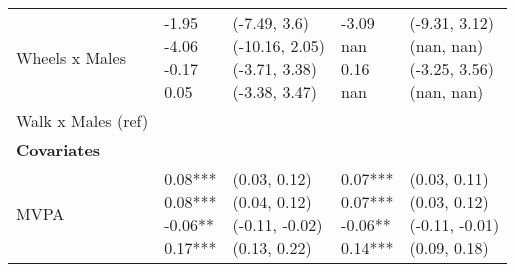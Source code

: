 \documentclass[10pt]{article}
\begin{document}
\begin{table}
\begin{center}
\begin{small}
\begin{tabular}{lllll}
\quad Wheels x Males    &  \makecell[l]{\textnormal{-1.95\phantom{***}} \\\textnormal{-4.06\phantom{***}} \\\textnormal{-0.17\phantom{***}} \\\textnormal{0.05\phantom{***}} \\}   &  \makecell[l]{\textnormal{(-7.49, 3.6)} \\\textnormal{(-10.16, 2.05)} \\\textnormal{(-3.71, 3.38)} \\\textnormal{(-3.38, 3.47)} \\}   &  \makecell[l]{\textnormal{-3.09\phantom{***}} \\\textnormal{nan\phantom{***}} \\\textnormal{0.16\phantom{***}} \\\textnormal{nan\phantom{***}} \\}   &  \makecell[l]{\textnormal{(-9.31, 3.12)} \\\textnormal{(nan, nan)} \\\textnormal{(-3.25, 3.56)} \\\textnormal{(nan, nan)} \\} \\ 
\quad Walk x Males (ref) & & & & \\ 
\textbf{Covariates} & & & & \\ 
\quad MVPA    &  \makecell[l]{\textnormal{0.08***} \\\textnormal{0.08***} \\\textnormal{-0.06**\phantom{*}} \\\textnormal{0.17***} \\}   &  \makecell[l]{\textnormal{(0.03, 0.12)} \\\textnormal{(0.04, 0.12)} \\\textnormal{(-0.11, -0.02)} \\\textnormal{(0.13, 0.22)} \\}   &  \makecell[l]{\textnormal{0.07***} \\\textnormal{0.07***} \\\textnormal{-0.06**\phantom{*}} \\\textnormal{0.14***} \\}   &  \makecell[l]{\textnormal{(0.03, 0.11)} \\\textnormal{(0.03, 0.12)} \\\textnormal{(-0.11, -0.01)} \\\textnormal{(0.09, 0.18)} \\} \\ 

\end{tabular}
\end{small}
\end{center}
\end{table}
\end{document}
